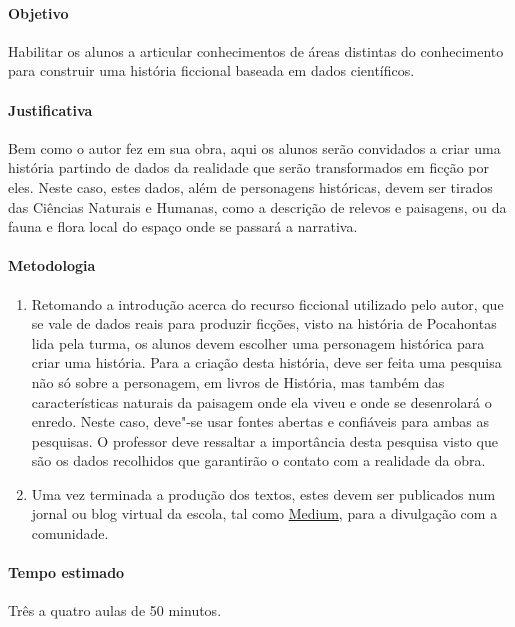\documentclass[12pt]{extarticle}
\begin{document}
 \paragraph{Objetivo} Habilitar os alunos a articular conhecimentos de áreas
 distintas do conhecimento para construir uma história ficcional baseada
 em dados científicos.

 \paragraph{Justificativa} Bem como o autor fez em sua obra, aqui os alunos
 serão convidados a criar uma história partindo de dados da realidade que
 serão transformados em ficção por eles. Neste caso, estes dados, além de personagens
 históricas, devem ser tirados das Ciências Naturais e Humanas, como a descrição de
 relevos e paisagens, ou da fauna e flora local do espaço onde se passará a narrativa.

 \paragraph{Metodologia}
 	\begin{enumerate}
 		\item
 		Retomando a introdução acerca do recurso ficcional utilizado pelo
 		autor, que se vale de dados reais para produzir ficções, visto na história 
 		de Pocahontas lida pela turma, os alunos devem escolher uma personagem 
 		histórica para criar uma história. 
 		Para a criação desta história, deve ser feita uma pesquisa não só sobre
 		a personagem, em livros de História, mas também das características 
 		naturais da paisagem onde ela viveu e onde se desenrolará o enredo.
 		Neste caso, deve"-se usar fontes abertas e confiáveis para ambas as pesquisas.
 		O professor deve ressaltar a importância desta pesquisa visto que são os dados
 		recolhidos que garantirão o contato com a realidade da obra.
 		\item
 		Uma vez terminada a produção dos textos, estes devem ser publicados 
 		num jornal ou blog virtual da escola, tal como \href{medium.com}{Medium},
 		para a divulgação com a comunidade.

 	\end{enumerate}

 \paragraph{Tempo estimado} Três a quatro aulas de 50 minutos.
\end{document}
